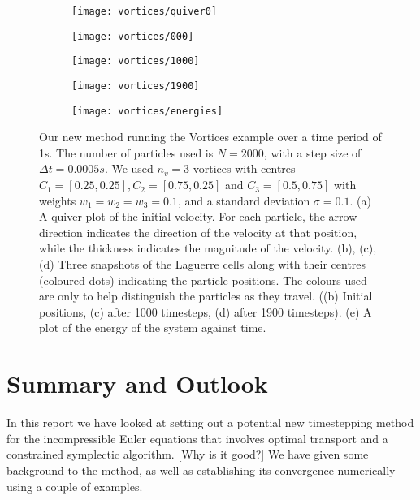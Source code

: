 \documentclass[11pt, oneside]{article}   	%
\newcommand{\dt}{\Delta t}
\begin{document}
\begin{figure}[h]
   \begin{subfigure}[t]{0.45\textwidth}
        \centering
        \texttt{[image: vortices/quiver0]}
        \caption{} \label{fig:timing2}
    \end{subfigure}
   \begin{subfigure}[t]{0.45\textwidth}
        \centering
        \texttt{[image: vortices/000]}
        \caption{} \label{fig:timing2}
    \end{subfigure}
   \begin{subfigure}[t]{0.45\textwidth}
        \centering
	\texttt{[image: vortices/1000]}
        \caption{} \label{fig:timing2}
    \end{subfigure}
   \begin{subfigure}[t]{0.45\textwidth}
        \centering
	\texttt{[image: vortices/1900]}
        \caption{} \label{fig:timing2}
    \end{subfigure}
   \begin{subfigure}[t]{0.45\textwidth}
        \centering
	\texttt{[image: vortices/energies]}
        \caption{} \label{fig:timing2}
    \end{subfigure}
\centering
\caption{Our new method running the Vortices example over a time period of 1s. The number of particles used is \(N = 2000\), with a step size of \(\dt = 0.0005s\). We used \(n_v = 3\) vortices with centres \(C_1 = [0.25, 0.25], C_2 = [0.75, 0.25] \) and \(C_3 = [0.5, 0.75]\) with weights \(w_1 = w_2 = w_3 = 0.1\), and a standard deviation \(\sigma = 0.1\). (a) A quiver plot of the initial velocity. For each particle, the arrow direction indicates the direction of the velocity at that position, while the thickness indicates the magnitude of the velocity. (b), (c), (d) Three snapshots of the Laguerre cells along with their centres (coloured dots) indicating the particle positions. The colours used are only to help distinguish the particles as they travel. ((b) Initial positions, (c) after 1000 timesteps, (d) after 1900 timesteps). (e) A plot of the energy of the system against time. }
\centering
\end{figure}




\section{Summary and Outlook}

In this report we have looked at setting out a potential new timestepping method for the incompressible Euler equations that involves optimal transport and a constrained symplectic algorithm. [Why is it good?] We have given some background to the method, as well as establishing its convergence numerically using a couple of examples. 
\end{document}
